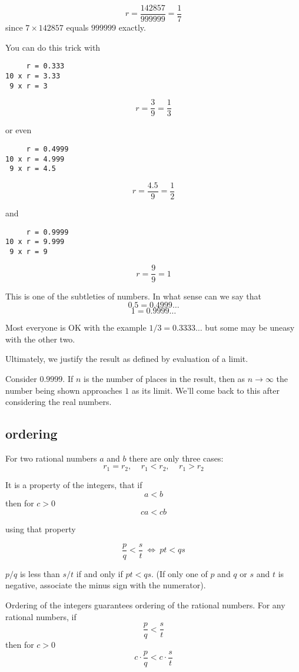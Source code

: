 \documentclass[11pt, oneside]{article}
\begin{document}
\[ r = \frac{142857}{999999} = \frac{1}{7} \]
since $7 \times 142857$ equals $999999$ exactly.

You can do this trick with 

\begin{verbatim}
     r = 0.333
10 x r = 3.33
 9 x r = 3
\end{verbatim}

\[ r = \frac{3}{9} = \frac{1}{3} \]

or even

\begin{verbatim}
     r = 0.4999
10 x r = 4.999
 9 x r = 4.5
\end{verbatim}

\[ r = \frac{4.5}{9} = \frac{1}{2} \]

and

\begin{verbatim}
     r = 0.9999
10 x r = 9.999
 9 x r = 9
\end{verbatim}

\[ r = \frac{9}{9} = 1 \]

This is one of the subtleties of numbers.  In what sense can we say that 
\[ 0.5 = 0.4999 \dots \]
\[ 1 = 0.9999 \dots \]

Most everyone is OK with the example $1/3 = 0.3333 \dots$ but some may be uneasy with the other two.

Ultimately, we justify the result as defined by evaluation of a limit.  

Consider $0.9999$.  If $n$ is the number of places in the result, then as $n \rightarrow \infty$ the number being shown approaches $1$ as its limit.  We'll come back to this after considering the real numbers.

\subsection*{ordering}
For two rational numbers $a$ and $b$ there are only three cases:  
\[ r_1 = r_2, \ \ \ \ \ r_1 < r_2, \ \ \ \ \ r_1 > r_2 \]

It is a property of the integers, that if
\[ a < b \]
then for $c > 0$
\[ ca < cb \]

using that property

\[ \frac{p}{q} < \frac{s}{t} \ \iff \ pt < qs \]

$p/q$ is less than $s/t$ if and only if $pt < qs$.  (If only one of $p$ and $q$ or $s$ and $t$ is negative, associate the minus sign with the numerator).

Ordering of the integers guarantees ordering of the rational numbers.  For any rational numbers, if
\[ \frac{p}{q} < \frac{s}{t} \]
then for $c > 0$
\[ c \cdot \frac{p}{q} < c \cdot \frac{s}{t} \]
\end{document}
